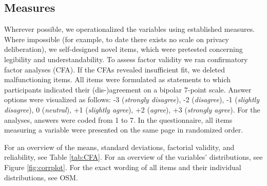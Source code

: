 \documentclass[
  english,
  man,floatsintext]{apa6}
\begin{document}
\hypertarget{measures}{%
\subsection{Measures}\label{measures}}

Wherever possible, we operationalized the variables using established measures.
Where impossible (for example, to date there exists no scale on privacy deliberation), we self-designed novel items, which were pretested concerning legibility and understandability.
To assess factor validity we ran confirmatory factor analyses (CFA).
If the CFAs revealed insufficient fit, we deleted malfunctioning items.
All items were formulated as statements to which participants indicated their (dis-)agreement on a bipolar 7-point scale.
Answer options were visualized as follows: -3 (\emph{strongly disagree}), -2 (\emph{disagree}), -1 (\emph{slightly disagree}), 0 (\emph{neutral}), +1 (\emph{slightly agree}), +2 (\emph{agree}), +3 (\emph{strongly agree}).
For the analyses, answers were coded from 1 to 7.
In the questionnaire, all items measuring a variable were presented on the same page in randomized order.

For an overview of the means, standard deviations, factorial validity, and reliability, see Table \ref{tab:CFA}.
For an overview of the variables' distributions, see Figure \ref{fig:corrplot}.
For the exact wording of all items and their individual distributions, see OSM.
\end{document}
